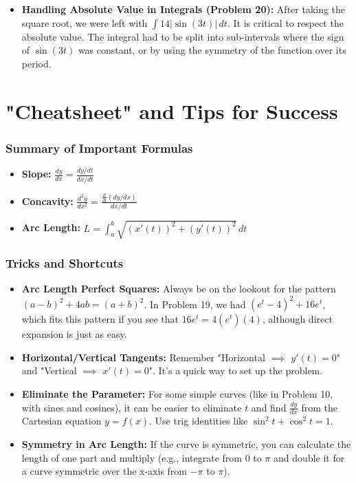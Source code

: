 \documentclass{article}
\begin{document}
\begin{itemize}
\begin{itemize}
        \end{itemize}
    \item \textbf{Handling Absolute Value in Integrals (Problem 20):} After taking the square root, we were left with $\int 14|\sin(3t)| \, dt$. It is critical to respect the absolute value. The integral had to be split into sub-intervals where the sign of $\sin(3t)$ was constant, or by using the symmetry of the function over its period.
\end{itemize}

\part{"Cheatsheet" and Tips for Success}

\section{Summary of Important Formulas}
\begin{itemize}
    \item \textbf{Slope:} $\displaystyle \frac{dy}{dx} = \frac{dy/dt}{dx/dt}$
    \item \textbf{Concavity:} $\displaystyle \frac{d^2y}{dx^2} = \frac{\frac{d}{dt}(dy/dx)}{dx/dt}$
    \item \textbf{Arc Length:} $\displaystyle L = \int_{a}^{b} \sqrt{(x'(t))^2 + (y'(t))^2} \, dt$
\end{itemize}

\section{Tricks and Shortcuts}
\begin{itemize}
    \item \textbf{Arc Length Perfect Squares:} Always be on the lookout for the pattern $(a-b)^2 + 4ab = (a+b)^2$. In Problem 19, we had $(e^t-4)^2 + 16e^t$, which fits this pattern if you see that $16e^t = 4(e^t)(4)$, although direct expansion is just as easy.
    \item \textbf{Horizontal/Vertical Tangents:} Remember "Horizontal $\implies$ $y'(t)=0$" and "Vertical $\implies$ $x'(t)=0$". It's a quick way to set up the problem.
    \item \textbf{Eliminate the Parameter:} For some simple curves (like in Problem 10, with sines and cosines), it can be easier to eliminate $t$ and find $\frac{dy}{dx}$ from the Cartesian equation $y=f(x)$. Use trig identities like $\sin^2 t + \cos^2 t = 1$.
    \item \textbf{Symmetry in Arc Length:} If the curve is symmetric, you can calculate the length of one part and multiply (e.g., integrate from 0 to $\pi$ and double it for a curve symmetric over the x-axis from $-\pi$ to $\pi$).
\end{itemize}
\end{document}
